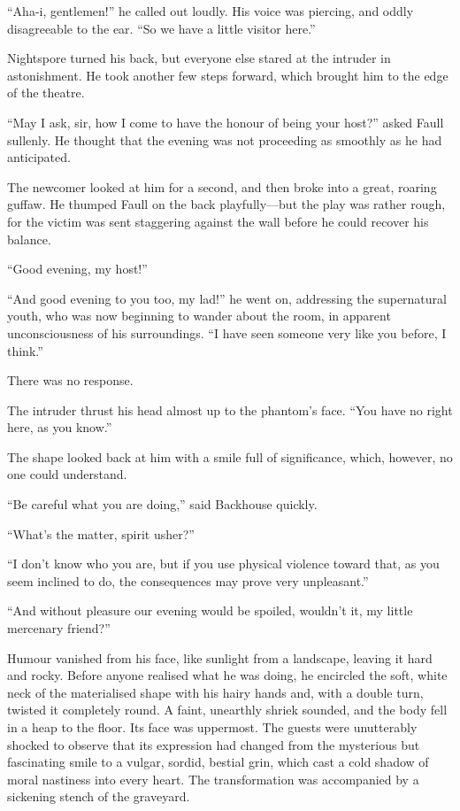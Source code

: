 ``Aha-i, gentlemen!'' he called out loudly. His voice was piercing, and oddly disagreeable to the ear. ``So we have a little visitor here.''

Nightspore turned his back, but everyone else stared at the intruder in astonishment. He took another few steps forward, which brought him to the edge of the theatre.

``May I ask, sir, how I come to have the honour of being your host?'' asked Faull sullenly. He thought that the evening was not proceeding as smoothly as he had anticipated.

The newcomer looked at him for a second, and then broke into a great, roaring guffaw. He thumped Faull on the back playfully—but the play was rather rough, for the victim was sent staggering against the wall before he could recover his balance.

``Good evening, my host!''

``And good evening to you too, my lad!'' he went on, addressing the supernatural youth, who was now beginning to wander about the room, in apparent unconsciousness of his surroundings. ``I have seen someone very like you before, I think.''

There was no response.

The intruder thrust his head almost up to the phantom's face. ``You have no right here, as you know.''

The shape looked back at him with a smile full of significance, which, however, no one could understand.

``Be careful what you are doing,'' said Backhouse quickly.

``What's the matter, spirit usher?''

``I don't know who you are, but if you use physical violence toward that, as you seem inclined to do, the consequences may prove very unpleasant.''

``And without pleasure our evening would be spoiled, wouldn't it, my little mercenary friend?''

Humour vanished from his face, like sunlight from a landscape, leaving it hard and rocky. Before anyone realised what he was doing, he encircled the soft, white neck of the materialised shape with his hairy hands and, with a double turn, twisted it completely round. A faint, unearthly shriek sounded, and the body fell in a heap to the floor. Its face was uppermost. The guests were unutterably shocked to observe that its expression had changed from the mysterious but fascinating smile to a vulgar, sordid, bestial grin, which cast a cold shadow of moral nastiness into every heart. The transformation was accompanied by a sickening stench of the graveyard.

